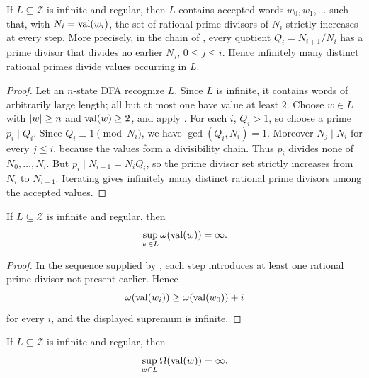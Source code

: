 \begin{corollary}
  \label{cor:new-rational-primes-in-every-infinite-regular-zeckendorf-language}
  If \(L\subseteq\mathcal Z\) is infinite and regular, then \(L\)
  contains accepted words \(w_0,w_1,\ldots\) such that, with
  \(N_i=\operatorname{val}(w_i)\), the set of rational prime divisors of \(N_i\)
  strictly increases at every step. More precisely, in the chain of
  , every quotient
  \(Q_i=N_{i+1}/N_i\) has a prime divisor that divides no earlier
  \(N_j\), \(0\le j\le i\). Hence infinitely many distinct rational
  primes divide values occurring in \(L\).
\end{corollary}

\begin{proof}
  Let an \(n\)-state DFA recognize \(L\). Since \(L\) is infinite, it
  contains words of arbitrarily large length; all but at most one have
  value at least \(2\). Choose \(w\in L\) with \(\lvert w \rvert\ge n\) and
  \(\operatorname{val}(w)\ge2\), and apply
  . For each \(i\),
  \(Q_i>1\), so choose a prime \(p_i\mid Q_i\). Since
  \(Q_i\equiv1\pmod {N_i}\), we have \(\gcd(Q_i,N_i)=1\). Moreover
  \(N_j\mid N_i\) for every \(j\le i\), because the values form a
  divisibility chain. Thus \(p_i\) divides none of
  \(N_0,\ldots,N_i\). But \(p_i\mid N_{i+1}=N_iQ_i\), so the prime
  divisor set strictly increases from \(N_i\) to \(N_{i+1}\). Iterating
  gives infinitely many distinct rational prime divisors among the
  accepted values.
\end{proof}

\begin{corollary}
  \label{cor:unbounded-distinct-prime-divisors}
  If \(L\subseteq\mathcal Z\) is infinite and regular, then
  \[
    \sup_{w\in L}\omega(\operatorname{val}(w))=\infty .
  \]
\end{corollary}

\begin{proof}
  In the sequence supplied by
  ,
  each step introduces at least one rational prime divisor not present
  earlier. Hence
  \[
    \omega(\operatorname{val}(w_i))\ge \omega(\operatorname{val}(w_0))+i
  \]
  for every \(i\), and the displayed supremum is infinite.
\end{proof}

\begin{corollary}
  \label{cor:unbounded-prime-factor-count-in-infinite-regular-zeckendorf-languages}
  If \(L\subseteq\mathcal Z\) is infinite and regular, then
  \[
    \sup_{w\in L}\Omega(\operatorname{val}(w))=\infty .
  \]
\end{corollary}

